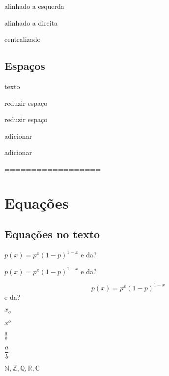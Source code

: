 \documentclass[12pt]{report}
\begin{document}
				\begin{flushleft}
					alinhado a esquerda
				\end{flushleft}
		
				\begin{flushright}
					alinhado a direita
				\end{flushright}
		
				\begin{center}
					centralizado
				\end{center}
			
			\subsection{Espaços}
			
				\par texto
				\par reduzir espaço
				\par \vspace{-10pt} reduzir espaço
				\par adicionar
				\par \vspace{+10pt} adicionar
				
				
				
				==================
				
				
				
				
				
				
				
				
				
				
				
				
				
		\section{Equações}
		
			\subsection{Equações no texto}
			
				\par\indent $ p(x)=p^x(1-p)^{1-x} $ e da?
				\par \( p(x)=p^x(1-p)^{1-x} \) e da?
				\par \[ p(x)=p^x(1-p)^{1-x} \] e da?
				
				\par $ x_{o} $
				\par $ x^{o} $
				\par $ \frac{a}{b} $
				\par $ \dfrac{a}{b} $
				\par $ \mathds{N,Z,Q,R,C} $
			
\end{document}
